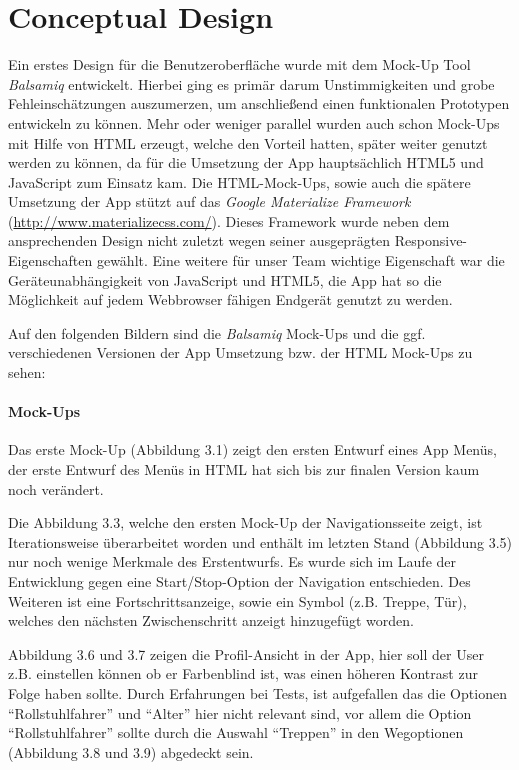 \chapter{Conceptual Design}
Ein erstes Design für die Benutzeroberfläche wurde mit dem Mock-Up Tool \textit{Balsamiq} entwickelt. Hierbei ging es primär darum Unstimmigkeiten und grobe Fehleinschätzungen auszumerzen, um anschließend einen funktionalen Prototypen entwickeln zu können. Mehr oder weniger parallel wurden auch schon Mock-Ups mit Hilfe von HTML erzeugt, welche den Vorteil hatten, später weiter genutzt werden zu können, da für die Umsetzung der App hauptsächlich HTML5 und JavaScript zum Einsatz kam. Die HTML-Mock-Ups, sowie auch die spätere Umsetzung der App stützt auf das \textit{Google Materialize Framework} (\url{http://www.materializecss.com/}). Dieses Framework wurde neben dem ansprechenden Design nicht zuletzt wegen seiner ausgeprägten Responsive-Eigenschaften gewählt. Eine weitere für unser Team wichtige Eigenschaft war die Geräteunabhängigkeit von JavaScript und HTML5, die App hat so die Möglichkeit auf jedem Webbrowser fähigen Endgerät genutzt zu werden.

Auf den folgenden Bildern sind die \textit{Balsamiq} Mock-Ups und die ggf. verschiedenen Versionen der App Umsetzung bzw. der HTML Mock-Ups zu sehen:

\newpage

\subsubsection*{Mock-Ups}

Das erste Mock-Up (Abbildung 3.1) zeigt den ersten Entwurf eines App Menüs, der erste Entwurf des Menüs in HTML hat sich bis zur finalen Version kaum noch verändert.

Die Abbildung 3.3, welche den ersten Mock-Up der Navigationsseite zeigt, ist Iterationsweise überarbeitet worden und enthält im letzten Stand (Abbildung 3.5) nur noch wenige Merkmale des Erstentwurfs. Es wurde sich im Laufe der Entwicklung gegen eine Start/Stop-Option der Navigation entschieden. Des Weiteren ist eine Fortschrittsanzeige, sowie ein Symbol (z.B. Treppe, Tür), welches den nächsten Zwischenschritt anzeigt hinzugefügt worden.

Abbildung 3.6 und 3.7 zeigen die Profil-Ansicht in der App, hier soll der User z.B. einstellen können ob er Farbenblind ist, was einen höheren Kontrast zur Folge haben sollte. Durch Erfahrungen bei Tests, ist aufgefallen das die Optionen "`Rollstuhlfahrer"' und "`Alter"' hier nicht relevant sind, vor allem die Option "`Rollstuhlfahrer"' sollte durch die Auswahl "`Treppen"' in den Wegoptionen (Abbildung 3.8 und 3.9) abgedeckt sein.

